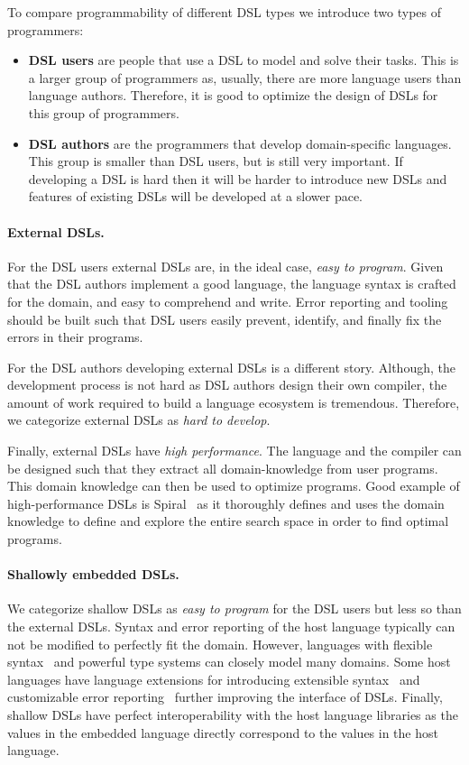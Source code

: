 To compare programmability of different DSL types we introduce two types of programmers:\begin{itemize}
  \item {\bf DSL users} are people that use a DSL to model and solve their tasks. This is a larger group of programmers as, usually, there are more language users than language authors. Therefore, it is good to optimize the design of DSLs for this group of programmers.

  \item {\bf DSL authors} are the programmers that develop domain-specific languages. This
   group is smaller than DSL users, but is still very important. If developing a DSL is hard
   then it will be harder to introduce new DSLs and features of existing DSLs will be
   developed at a slower pace.
 \end{itemize}

\paragraph{External DSLs.} For the DSL users external DSLs are, in the ideal case, \emph{easy to program}. Given that the DSL authors implement a good language, the language syntax is crafted for the domain, and easy to comprehend and write. Error reporting and tooling should be built such that DSL users easily prevent, identify, and finally fix the errors in their programs.

For the DSL authors developing external DSLs is a different story. Although, the development
process is not hard as DSL authors design their own compiler, the amount of work
required to build a language ecosystem is tremendous. Therefore, we categorize
external DSLs as \emph{hard to develop}. %

Finally, external DSLs have \emph{high performance}. The language and the compiler can be
designed such that they extract all domain-knowledge from user programs. This domain knowledge
can then be used to optimize programs. Good example of high-performance DSLs is Spiral~\cite{puschel2005spiral} as it thoroughly defines and uses the domain knowledge to define and explore the entire search space in order to find optimal programs.


\paragraph{Shallowly embedded DSLs.} We categorize shallow DSLs as \emph{easy to program} for
 the DSL users but less so than the external DSLs. Syntax and error reporting of the host language
 typically can not be modified to perfectly fit the domain. However, languages with flexible syntax~\cite{moors_scala-virtualized_2012,odersky2010contracts} and powerful type systems can closely model many domains. Some host languages have language extensions for introducing extensible syntax~\cite{SugarJ} and customizable error reporting~\cite{hage2007heuristics,heeren2003scripting} further improving the interface of DSLs. Finally, shallow DSLs have perfect interoperability with the host language libraries as the values in the embedded language directly correspond to the values in the host language.

